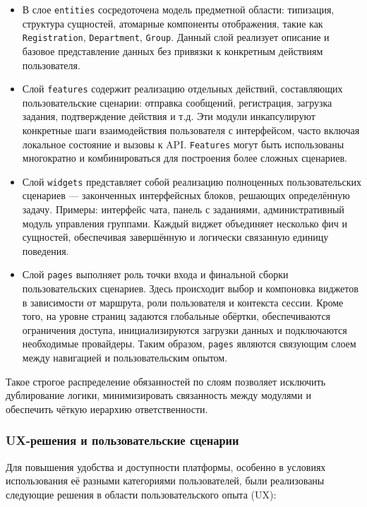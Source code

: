 \begin{itemize}
  	\item В слое \texttt{entities} сосредоточена модель предметной области: типизация, структура сущностей, атомарные компоненты отображения, такие как \texttt{Registration}, \texttt{Department}, \texttt{Group}. Данный слой реализует описание и базовое представление данных без привязки к конкретным действиям пользователя.
  
	\item Слой \texttt{features} содержит реализацию отдельных действий, составляющих пользовательские сценарии: отправка сообщений, регистрация, загрузка задания, подтверждение действия и т.д. Эти модули инкапсулируют конкретные шаги взаимодействия пользователя с интерфейсом, часто включая локальное состояние и вызовы к API. \texttt{Features} могут быть использованы многократно и комбинироваться для построения более сложных сценариев.
	
	\item Слой \texttt{widgets} представляет собой реализацию полноценных пользовательских сценариев — законченных интерфейсных блоков, решающих определённую задачу. Примеры: интерфейс чата, панель с заданиями, административный модуль управления группами. Каждый виджет объединяет несколько фич и сущностей, обеспечивая завершённую и логически связанную единицу поведения.
	
	\item Слой \texttt{pages} выполняет роль точки входа и финальной сборки пользовательских сценариев. Здесь происходит выбор и компоновка виджетов в зависимости от маршрута, роли пользователя и контекста сессии. Кроме того, на уровне страниц задаются глобальные обёртки, обеспечиваются ограничения доступа, инициализируются загрузки данных и подключаются необходимые провайдеры. Таким образом, \texttt{pages} являются связующим слоем между навигацией и пользовательским опытом.
\end{itemize}

Такое строгое распределение обязанностей по слоям позволяет исключить дублирование логики, минимизировать связанность между модулями и обеспечить чёткую иерархию ответственности.

\subsubsection{UX-решения и пользовательские сценарии}

Для повышения удобства и доступности платформы, особенно в условиях использования её разными категориями пользователей, были реализованы следующие решения в области пользовательского опыта (UX):

